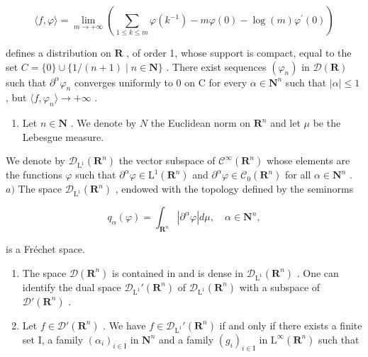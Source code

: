 \[
\langle f, \varphi \rangle = \lim _ {m \rightarrow + \infty} \left(\sum_ {1 \leqslant k \leqslant m} \varphi (k ^ {- 1}) - m \varphi (0) - \log (m) \varphi^ {\prime} (0)\right)
\]

defines a distribution on \(\mathbf{R}\) , of order 1, whose support is compact, equal to the set \(C = \{0\} \cup \{1/(n+1) \mid n \in \mathbf{N}\}\) . There exist sequences \((\varphi_n)\) in \(\mathcal{D}(\mathbf{R})\) such that \(\partial^{\alpha}\varphi_{n}\) converges uniformly to 0 on C for every \(\alpha\in\mathbf{N}^{n}\) such that \(|\alpha|\leqslant1\) , but \(\langle f,\varphi_{n}\rangle\to+\infty\) .

\begin{enumerate}
\def\labelenumi{\arabic{enumi})}
\setcounter{enumi}{24}
\tightlist
\item
  Let \(n \in \mathbf{N}\) . We denote by \(N\) the Euclidean norm on \(\mathbf{R}^n\) and let \(\mu\) be the Lebesgue measure.
\end{enumerate}

We denote by \(\mathcal{D}_{\mathrm{L}^{1}}(\mathbf{R}^{n})\) the vector subspace of \(\mathcal{C}^{\infty}(\mathbf{R}^{n})\) whose elements are the functions \(\varphi\) such that \(\partial^{\alpha}\varphi\in\mathrm{L}^{1}(\mathbf{R}^{n})\) and \(\partial^{\alpha}\varphi\in\mathcal{C}_{0}(\mathbf{R}^{n})\) for all \(\alpha\in\mathbf{N}^{n}\) . \(a)\) The space \(\mathcal{D}_{\mathrm{L}^{1}}(\mathbf{R}^{n})\) , endowed with the topology defined by the seminorms

\[
q _ {\alpha} (\varphi) = \int_ {\mathbf {R} ^ {n}} | \partial^ {\alpha} \varphi | d \mu , \quad \alpha \in \mathbf {N} ^ {n},
\]

is a Fréchet space.

\begin{enumerate}
\def\labelenumi{\alph{enumi})}
\setcounter{enumi}{1}
\item
  The space \(\mathcal{D}(\mathbf{R}^n)\) is contained in and is dense in \(\mathcal{D}_{\mathrm{L}^1}(\mathbf{R}^n)\) . One can identify the dual space \(\mathcal{D}_{\mathrm{L}^1}'(\mathbf{R}^n)\) of \(\mathcal{D}_{\mathrm{L}^1}(\mathbf{R}^n)\) with a subspace of \(\mathcal{D}'(\mathbf{R}^n)\) .
\item
  Let \(f \in \mathcal{D}'(\mathbf{R}^n)\) . We have \(f \in \mathcal{D}_{\mathrm{L}^1}'(\mathbf{R}^n)\) if and only if there exists a finite set I, a family \((\alpha_i)_{i \in \mathrm{I}}\) in \(\mathbf{N}^n\) and a family \((g_i)_{i \in \mathrm{I}}\) in \(\mathrm{L}^\infty(\mathbf{R}^n)\) such that
\end{enumerate}

